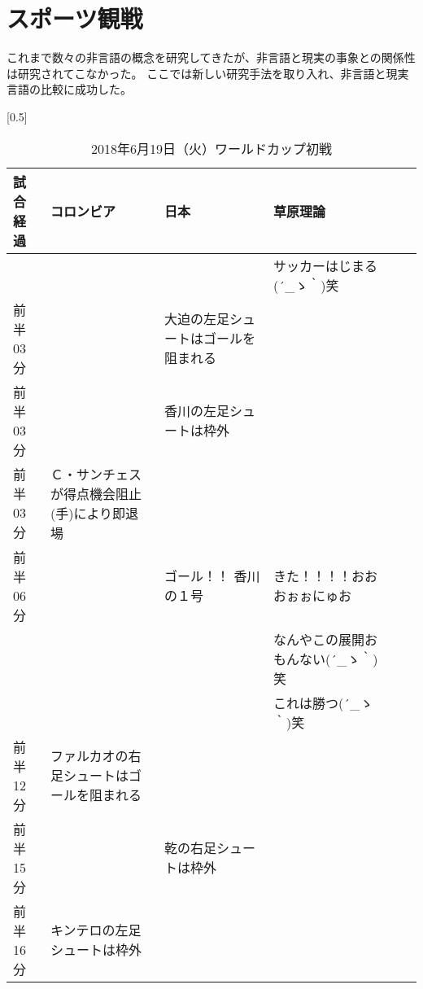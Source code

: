\section{スポーツ観戦}
これまで数々の非言語の概念を研究してきたが、非言語と現実の事象との関係性は研究されてこなかった。
ここでは新しい研究手法を取り入れ、非言語と現実言語の比較に成功した。

\begin{table}[htb]
  \centering
  \caption{2018年6月19日（火）ワールドカップ初戦}
  \label{my-label}
  \scalebox{0.5}[0.5]{
    \begin{tabular}{|l|l|l|l|l|l|} \hline
      試合経過  & コロンビア                                   & 日本                                 & 草原理論  \\ \hline \hline
                &                                              &                                       & サッカーはじまる\sf(´\_ゝ｀)笑 \\ \hline \hline
      前半03分  &                                              & 大迫の左足シュートはゴールを阻まれる  &                                  \\ \hline
      前半03分  &                                              & 香川の左足シュートは枠外              &                                  \\ \hline
      前半03分  & Ｃ・サンチェスが得点機会阻止(手)により即退場 &                                       &                                   \\ \hline
      前半06分  &                                              & ゴール！！ 香川の１号                 & きた！！！！おおおぉぉにゅお  \\ \hline
                &                                              &                                       & なんやこの展開おもんない\sf (´\_ゝ｀)笑\\ \hline
                &                                              &                                       & これは勝つ\sf (´\_ゝ｀)笑\\ \hline
      前半12分  & ファルカオの右足シュートはゴールを阻まれる   &                                       &   \\ \hline
      前半15分  &                                              & 乾の右足シュートは枠外                &    \\ \hline
      前半16分  & キンテロの左足シュートは枠外                 &                                       & \\ \hline

\end{tabular}}
\end{table}
